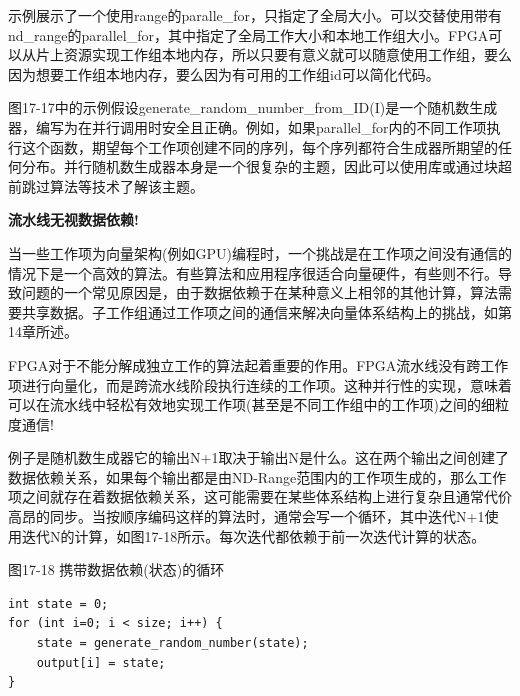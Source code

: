 示例展示了一个使用range的paralle\_for，只指定了全局大小。可以交替使用带有nd\_range的parallel\_for，其中指定了全局工作大小和本地工作组大小。FPGA可以从片上资源实现工作组本地内存，所以只要有意义就可以随意使用工作组，要么因为想要工作组本地内存，要么因为有可用的工作组id可以简化代码。\par

\begin{tcolorbox}[colback=blue!5!white,colframe=blue!75!black, title=并行随机数生成器]
图17-17中的示例假设generate\_random\_number\_from\_ID(I)是一个随机数生成器，编写为在并行调用时安全且正确。例如，如果parallel\_for内的不同工作项执行这个函数，期望每个工作项创建不同的序列，每个序列都符合生成器所期望的任何分布。并行随机数生成器本身是一个很复杂的主题，因此可以使用库或通过块超前跳过算法等技术了解该主题。
\end{tcolorbox}

\hspace*{\fill} \par %
\textbf{流水线无视数据依赖!}

当一些工作项为向量架构(例如GPU)编程时，一个挑战是在工作项之间没有通信的情况下是一个高效的算法。有些算法和应用程序很适合向量硬件，有些则不行。导致问题的一个常见原因是，由于数据依赖于在某种意义上相邻的其他计算，算法需要共享数据。子工作组通过工作项之间的通信来解决向量体系结构上的挑战，如第14章所述。\par

FPGA对于不能分解成独立工作的算法起着重要的作用。FPGA流水线没有跨工作项进行向量化，而是跨流水线阶段执行连续的工作项。这种并行性的实现，意味着可以在流水线中轻松有效地实现工作项(甚至是不同工作组中的工作项)之间的细粒度通信!\par

例子是随机数生成器它的输出N+1取决于输出N是什么。这在两个输出之间创建了数据依赖关系，如果每个输出都是由ND-Range范围内的工作项生成的，那么工作项之间就存在着数据依赖关系，这可能需要在某些体系结构上进行复杂且通常代价高昂的同步。当按顺序编码这样的算法时，通常会写一个循环，其中迭代N+1使用迭代N的计算，如图17-18所示。每次迭代都依赖于前一次迭代计算的状态。\par

\hspace*{\fill} \par %
图17-18 携带数据依赖(状态)的循环
\begin{lstlisting}[caption={}]
int state = 0;
for (int i=0; i < size; i++) {
	state = generate_random_number(state);
	output[i] = state;
}
\end{lstlisting}

